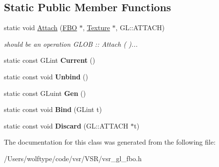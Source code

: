 \subsection*{Static Public Member Functions}
\begin{DoxyCompactItemize}
\item 
\hypertarget{classvsr_1_1_f_b_o_a97073d0b7d3b28691269f3f3090eb97b}{static void \hyperlink{classvsr_1_1_f_b_o_a97073d0b7d3b28691269f3f3090eb97b}{Attach} (\hyperlink{classvsr_1_1_f_b_o}{F\-B\-O} $\ast$, \hyperlink{classvsr_1_1_texture}{Texture} $\ast$, G\-L\-::\-A\-T\-T\-A\-C\-H)}\label{classvsr_1_1_f_b_o_a97073d0b7d3b28691269f3f3090eb97b}

\begin{DoxyCompactList}\small\item\em should be an operation G\-L\-O\-B \-:\-: Attach ( )... \end{DoxyCompactList}\item 
\hypertarget{classvsr_1_1_f_b_o_ae9767558f870118200abf683437677c0}{static const G\-Lint {\bfseries Current} ()}\label{classvsr_1_1_f_b_o_ae9767558f870118200abf683437677c0}

\item 
\hypertarget{classvsr_1_1_f_b_o_ac0123cba221814de55b2f6c12dce38bd}{static const void {\bfseries Unbind} ()}\label{classvsr_1_1_f_b_o_ac0123cba221814de55b2f6c12dce38bd}

\item 
\hypertarget{classvsr_1_1_f_b_o_a1961b5535a7294c4ffafae36e22cb629}{static const G\-Luint {\bfseries Gen} ()}\label{classvsr_1_1_f_b_o_a1961b5535a7294c4ffafae36e22cb629}

\item 
\hypertarget{classvsr_1_1_f_b_o_a1993cd0f6f26da604ae1cb86f350436f}{static const void {\bfseries Bind} (G\-Lint t)}\label{classvsr_1_1_f_b_o_a1993cd0f6f26da604ae1cb86f350436f}

\item 
\hypertarget{classvsr_1_1_f_b_o_a29f2a427e9757784de04c030657975a6}{static const void {\bfseries Discard} (G\-L\-::\-A\-T\-T\-A\-C\-H $\ast$t)}\label{classvsr_1_1_f_b_o_a29f2a427e9757784de04c030657975a6}

\end{DoxyCompactItemize}


The documentation for this class was generated from the following file\-:\begin{DoxyCompactItemize}
\item 
/\-Users/wolftype/code/vsr/\-V\-S\-R/vsr\-\_\-gl\-\_\-fbo.\-h\end{DoxyCompactItemize}
